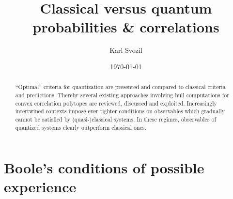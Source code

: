 \documentclass[%
  twocolumn,
 showpacs,
 showkeys,
 preprintnumbers,
 amsmath,amssymb,
 aps,
  pra,
  longbibliography,
 floatfix,
 ]{revtex4-1}
\begin{document}
\title{Classical versus quantum probabilities \& correlations}


\author{Karl Svozil}



\date{\today}

\begin{abstract}
``Optimal'' criteria for quantization are presented and compared to classical criteria and predictions. Thereby several existing approaches involving hull computations for convex correlation polytopes are reviewed, discussed and exploited.  Increasingly intertwined contexts impose ever tighter conditions on observables which gradually cannot be satisfied by (quasi-)classical systems. In these regimes, observables of quantized systems clearly outperform classical ones.
\end{abstract}


\maketitle

\section{Boole's conditions of possible experience}
\label{2017-b-eh}


\end{document}
